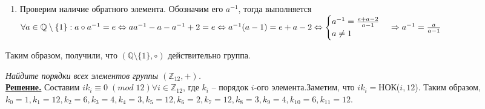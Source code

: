 \documentclass[14pt,a4paper]{scrartcl}
\begin{document}
\begin{spacing}{1}
\begin{enumerate}
	\item Проверим наличие обратного элемента. Обозначим его $a^{-1}$, тогда выполняется $\forall a \in \mathbb{Q}\setminus\{1\}: a \circ a^{-1} = e \Leftrightarrow aa^{-1} - a - a^{-1} + 2 = e \Leftrightarrow \\ a^{-1}(a - 1) = e + a - 2 \Leftrightarrow
	\begin{cases}
	a^{-1} = \frac{e + a - 2}{a - 1}\\
	a \neq 1
	\end{cases} \Rightarrow a^{-1} = \frac{a}{a - 1}$
\end{enumerate}
Таким образом, получили, что $(\mathbb{Q} \setminus{\{1\}}, \circ)$ действительно группа.

\begin{center}
\end{center}
\textit{Найдите порядки всех элементов группы $(\mathbb{Z}_{12}, +)$.}\\
\noindent \textbf{\underline{Решение.}} Составим $ik_i \equiv 0\;(mod\;12) \forall i \in \mathbb{Z}_{12}$, где $k_i$ -- порядок $i$-ого элемента.Заметим, что $ik_i = $НОК($i, 12$). Таким образом, $k_0 = 1, k_1 = 12, k_2 = 6, k_3 = 4, k_4 = 3, k_5 = 12, k_6 = 2, k_7 = 12, k_8 = 3, k_9 = 4, k_{10} = 6, k_{11} = 12$.


\end{spacing}
\end{document}
